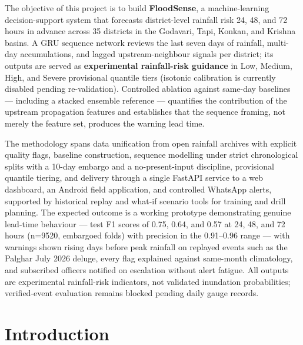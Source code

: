 \documentclass[a4paper,12pt]{report}
\begin{document}
The objective of this project is to build \textbf{FloodSense}, a machine-learning decision-support system that forecasts district-level rainfall risk 24, 48, and 72 hours in advance across 35 districts in the Godavari, Tapi, Konkan, and Krishna basins. A GRU sequence network reviews the last seven days of rainfall, multi-day accumulations, and lagged upstream-neighbour signals per district; its outputs are served as \textbf{experimental rainfall-risk guidance} in Low, Medium, High, and Severe provisional quantile tiers (isotonic calibration is currently disabled pending re-validation). Controlled ablation against same-day baselines --- including a stacked ensemble reference --- quantifies the contribution of the upstream propagation features and establishes that the sequence framing, not merely the feature set, produces the warning lead time.

The methodology spans data unification from open rainfall archives with explicit quality flags, baseline construction, sequence modelling under strict chronological splits with a 10-day embargo and a no-present-input discipline, provisional quantile tiering, and delivery through a single FastAPI service to a web dashboard, an Android field application, and controlled WhatsApp alerts, supported by historical replay and what-if scenario tools for training and drill planning. The expected outcome is a working prototype demonstrating genuine lead-time behaviour --- test F1 scores of 0.75, 0.64, and 0.57 at 24, 48, and 72 hours (n=9520, embargoed folds) with precision in the 0.91--0.96 range --- with warnings shown rising days before peak rainfall on replayed events such as the Palghar July 2026 deluge, every flag explained against same-month climatology, and subscribed officers notified on escalation without alert fatigue. All outputs are experimental rainfall-risk indicators, not validated inundation probabilities; verified-event evaluation remains blocked pending daily gauge records.

\clearpage
\setcounter{tocdepth}{0} %
\tableofcontents
\clearpage
\listoffigures
\listoftables
\clearpage

\chapter{Introduction}
\end{document}
